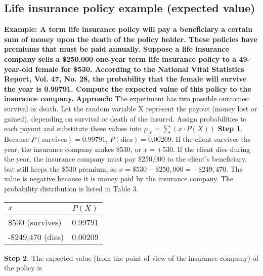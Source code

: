 \documentclass{report}
\begin{document}
      \subsection*{Life insurance policy example (expected value)}
      \bigbreak \noindent 
      \begin{mdframed}
      \textbf{Example: A term life insurance policy will pay a beneficiary a certain sum of money upon the death of the policy holder. These policies have premiums that must be paid annually. Suppose a life insurance company sells a \$250,000 one-year term life insurance policy to a 49-year-old female for \$530. According to the National Vital Statistics Report, Vol. 47, No. 28, the probability that the female will survive the year is 0.99791. Compute the expected value of this policy to the insurance company.}
      \bigbreak \noindent 
      \textbf{Approach:}
      \bigbreak \noindent 
      The experiment has two possible outcomes: survival or death. Let the random variable X represent the payout (money lost or gained), depending on survival or death of the insured. Assign probabilities to each payout and substitute these values into $\mu_{X} = \sum (x \cdot P(X)) $
      \bigbreak \noindent 
      \textbf{Step 1}. Because $P(\text{survives}) = 0.99791$, $P(\text{dies}) = 0.00209$. If the client survives the year, the insurance company makes \$530, or $x = +530$. If the client dies during the year, the insurance company must pay \$250,000 to the client's beneficiary, but still keeps the \$530 premium; so $x = \$530 - \$250,000 = -\$249,470$. The value is negative because it is money paid by the insurance company. The probability distribution is listed in Table 3.
      \begin{center}
          \begin{center}
              \begin{tabular}{|l|c|}
              \hline
              $x$ & $ P(X)$ \\
              	\hline
               	\$530 (survives)  & 0.99791  \\
              	\hline
              	-\$249,470 (dies) &0.00209 \\
              	\hline
              \end{tabular}
          \end{center}
      \end{center}
      \bigbreak \noindent 
      \textbf{Step 2.} The expected value (from the point of view of the insurance company) of the policy is
      \begin{align*}

\end{align*}
\end{mdframed}
\end{document}
